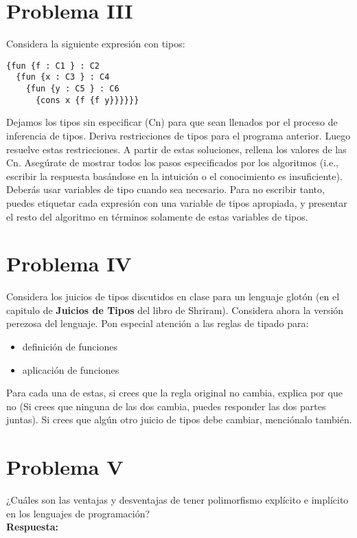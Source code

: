 \documentclass{article}
\begin{document}
  

\section*{Problema III}
Considera la siguiente expresión con tipos:

\begin{verbatim}
{fun {f : C1 } : C2
  {fun {x : C3 } : C4
    {fun {y : C5 } : C6
      {cons x {f {f y}}}}}}
\end{verbatim}

Dejamos los tipos sin especificar (Cn) para que sean llenados por el proceso
de inferencia de tipos. Deriva restricciones de tipos para el programa anterior.
Luego resuelve estas restricciones. A partir de estas soluciones, rellena los
valores de las Cn. Asegúrate de mostrar todos los pasos especificados por los
algoritmos (i.e., escribir la respuesta basándose en la intuición o el conocimiento
es insuficiente). Deberás usar variables de tipo cuando sea necesario.
Para no escribir tanto, puedes etiquetar cada expresión con una variable de tipos
apropiada, y presentar el resto del algoritmo en términos solamente de estas
variables de tipos.

\section*{Problema IV}
Considera los juicios de tipos discutidos en clase para un lenguaje glotón
(en el capitulo de \textbf{Juicios de Tipos} del libro de Shriram).
Considera ahora la versión perezosa del lenguaje. Pon especial atención a
las reglas de tipado para:

\begin{itemize}
\item definición de funciones
\item aplicación de funciones
\end{itemize}

Para cada una de estas, si crees que la regla original no cambia, explica por que no
(Si crees que ninguna de las dos cambia, puedes responder las dos partes juntas).
Si crees que algún otro juicio de tipos debe cambiar, menciónalo también.

\section*{Problema V}
¿Cuáles son las ventajas y desventajas de tener polimorfismo explícito e implícito
en los lenguajes de programación?
\\
\textbf{Respuesta: }
\\
\end{document}
